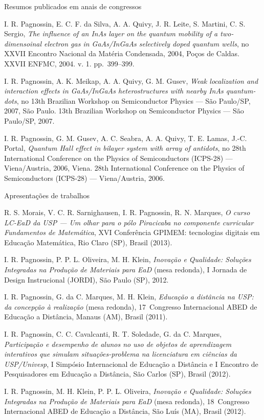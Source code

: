 \begin{compactitem}
	\item Resumos publicados em anais de congressos
	\begin{compactitem}
		\item I. R. Pagnossin, E. C. F. da Silva, A. A. Quivy, J. R. Leite, S. Martini, C. S. Sergio, \textsl{The influence of an InAs layer on the quantum mobility of a two-dimensoinal electron gas in GaAs/InGaAs selectively doped quantum wells}, no XXVII Encontro Nacional da Matéria Condensada, 2004, Poços de Caldas. XXVII ENFMC, 2004. v. 1. pp.~399--399.
		\item I. R. Pagnossin, A. K. Meikap, A. A. Quivy, G. M. Gusev, \textsl{Weak localization and interaction effects in GaAs/InGaAs heterostructures with nearby InAs quantum-dots}, no 13th Brazilian Workshop on Semiconductor Physics --- São Paulo/SP, 2007, São Paulo. 13th Brazilian Workshop on Semiconductor Physics --- São Paulo/SP, 2007.
		\item I. R. Pagnossin, G. M. Gusev, A. C. Seabra, A. A. Quivy, T. E. Lamas, J.-C. Portal, \textsl{Quantum Hall effect in bilayer system with array of antidots}, no 28th International Conference on the Physics of Semiconductors (ICPS-28) --- Viena/Austria, 2006, Viena. 28th International Conference on the Physics of Semiconductors (ICPS-28) --- Viena/Austria, 2006.	
	\end{compactitem}
	
	\item Apresentações de trabalhos
	\begin{compactitem}
		\item R. S. Morais, V. C. R. Sarnighausen, I. R. Pagnossin, R. N. Marques, \textsl{O curso LC-EaD da USP --- Um olhar para o pólo Piracicaba no componente curricular Fundamentos de Matemática}, XVI Conferência GPIMEM: tecnologias digitais em Educação Matemática, Rio Claro (SP), Brasil (2013).
		\item I. R. Pagnossin, P. P. L. Oliveira, M. H. Klein, \textsl{Inovação e Qualidade: Soluções Integradas na Produção de Materiais para EaD} (mesa redonda), I Jornada de Design Instrucional (JORDI), São Paulo (SP), 2012.
		\item I. R. Pagnossin, G. da C. Marques, M. H. Klein, \textsl{Educação a distância na USP: da concepção à realização} (mesa redonda), 17\textordmasculine\ Congresso Internacional ABED de Educação a Distância, Manaus (AM), Brasil (2011).
		\item I. R. Pagnossin, C. C. Cavalcanti, R. T. Soledade, G. da C. Marques, \textsl{Participação e desempenho de alunos no uso de objetos de aprendizagem interativos que simulam situações-problema na licenciatura em ciências da USP/Univesp}, I Simpósio Internacional de Educação a Distância e I Encontro de Pesquisadores em Educação a Distância, São Carlos (SP), Brasil (2012).
		\item I. R. Pagnossin, M. H. Klein, P. P. L. Oliveira, \textsl{Inovação e Qualidade: Soluções Integradas na Produção de Materiais para EaD} (mesa redonda), 18\textordmasculine\ Congresso Internacional ABED de Educação a Distância, São Luís (MA), Brasil (2012).
	\end{compactitem}
\end{compactitem}

